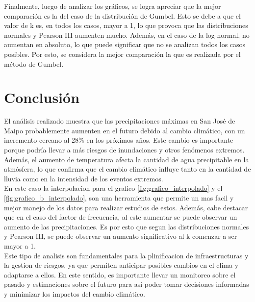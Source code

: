 \documentclass{article}  %
\begin{document}
Finalmente, luego de analizar los gráficos, se logra apreciar que la mejor comparación es la del caso de la distribución de Gumbel. Esto se debe a que el valor de k es, en todos los casos, mayor a 1, lo que provoca que las distribuciones normales y Pearson III aumenten mucho. Además, en el caso de la log-normal, no aumentan en absoluto, lo que puede significar que no se analizan todos los casos posibles. Por esto, se considera la mejor comparación la que es realizada por el método de Gumbel.

\newpage
\section{Conclusión}

El análisis realizado muestra que las precipitaciones máximas en San José de Maipo probablemente aumenten en el futuro debido al cambio climático, con un incremento cercano al 28\% en los próximos años. Este cambio es importante porque podría llevar a más riesgos de inundaciones y otros fenómenos extremos. Además, el aumento de temperatura afecta la cantidad de agua precipitable en la atmósfera, lo que confirma que el cambio climático influye tanto en la cantidad de lluvia como en la intensidad de los eventos extremos. \\
En este caso la interpolacion para el grafico \ref{fig:grafico_interpolado} y el \ref{fig:grafico_b_interpolado}, son una herramienta que permite un mas facil y mejor manejo de los datos para realizar estudios de estos. Además, cabe destacar que en el caso del factor de frecuencia, al este aumentar se puede observar un aumento de las precipitaciones. Es por esto que segun las distribuciones normales y Pearson III, se puede observar un aumento significativo al k comenzar a ser mayor a 1. \\
Este tipo de analisis son fundamentales para la plinificacion de infraestructuras y la gestion de riesgos, ya que permiten anticipar posibles cambios en el clima y adaptarse a ellos. En este sentido, es importante llevar un monitoreo sobre el pasado y estimaciones sobre el futuro para asi poder tomar decisiones informadas y minimizar los impactos del cambio climático.
\end{document}
